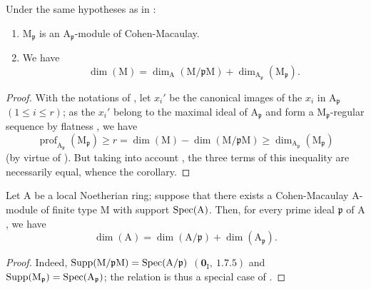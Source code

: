 \begin{corollary}[16.5.10]
\label{0.16.5.10}
Under the same hypotheses as in :
\begin{enumerate}
  \item[\rm{(i)}] $\mathrm{M}_\mathfrak{p}$ is an $\mathrm{A}_\mathfrak{p}$-module of Cohen-Macaulay.
  \item[\rm{(ii)}] We have
  \begin{equation}
  \label{0.16.5.10.1}
  \tag{16.5.10.1}
    \dim(\mathrm{M})=\dim_\mathrm{A}(\mathrm{M}/\mathfrak{p}\mathrm{M})+\dim_{\mathrm{A}_\mathfrak{p}}(\mathrm{M}_\mathfrak{p}).
  \end{equation}
\end{enumerate}
\end{corollary}

\begin{proof}
With the notations of , let $x_i'$ be the canonical images of the $x_i$ in $\mathrm{A}_\mathfrak{p}$ $(1\leq i\leq r)$; as the $x_i'$ belong to the maximal ideal of $\mathrm{A}_\mathfrak{p}$ and form a $\mathrm{M}_\mathfrak{p}$-regular sequence by flatness , we have
\[
  \operatorname{prof}_{\mathrm{A}_\mathfrak{p}}(\mathrm{M}_\mathfrak{p})\geq r=\dim(\mathrm{M})-\dim(\mathrm{M}/\mathfrak{p}\mathrm{M})\geq\dim_{\mathrm{A}_\mathfrak{p}}(\mathrm{M}_\mathfrak{p})
\]
(by virtue of ).
But taking into account , the three terms of this inequality are necessarily equal, whence the corollary.
\end{proof}


\begin{corollary}[16.5.11]
\label{0.16.5.11}
Let $\mathrm{A}$ be a local Noetherian ring; suppose that there exists a Cohen-Macaulay $\mathrm{A}$-module of finite type $\mathrm{M}$ with support $\operatorname{Spec}(\mathrm{A})$.
Then, for every prime ideal $\mathfrak{p}$ of $\mathrm{A}$, we have
\begin{equation}
\label{0.16.5.11.1}
\tag{16.5.11.1}
  \dim(\mathrm{A})=\dim(\mathrm{A}/\mathfrak{p})+\dim(\mathrm{A}_\mathfrak{p}).
\end{equation}
\end{corollary}

\begin{proof}
Indeed, $\operatorname{Supp}(\mathrm{M}/\mathfrak{p}\mathrm{M})=\operatorname{Spec}(\mathrm{A}/\mathfrak{p})$ $(\mathbf{0}_\mathrm{I},~1.7.5)$ and $\operatorname{Supp}(\mathrm{M}_\mathfrak{p})=\operatorname{Spec}(\mathrm{A}_\mathfrak{p})$; the relation  is thus a special case of .
\end{proof}

